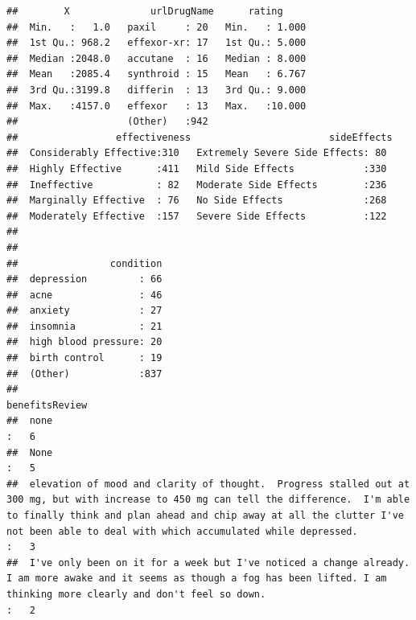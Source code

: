 \documentclass[spanish,]{article}
\begin{document}
\begin{verbatim}
##        X              urlDrugName      rating      
##  Min.   :   1.0   paxil     : 20   Min.   : 1.000  
##  1st Qu.: 968.2   effexor-xr: 17   1st Qu.: 5.000  
##  Median :2048.0   accutane  : 16   Median : 8.000  
##  Mean   :2085.4   synthroid : 15   Mean   : 6.767  
##  3rd Qu.:3199.8   differin  : 13   3rd Qu.: 9.000  
##  Max.   :4157.0   effexor   : 13   Max.   :10.000  
##                   (Other)   :942                   
##                 effectiveness                        sideEffects 
##  Considerably Effective:310   Extremely Severe Side Effects: 80  
##  Highly Effective      :411   Mild Side Effects            :330  
##  Ineffective           : 82   Moderate Side Effects        :236  
##  Marginally Effective  : 76   No Side Effects              :268  
##  Moderately Effective  :157   Severe Side Effects          :122  
##                                                                  
##                                                                  
##                condition  
##  depression         : 66  
##  acne               : 46  
##  anxiety            : 27  
##  insomnia           : 21  
##  high blood pressure: 20  
##  birth control      : 19  
##  (Other)            :837  
##                                                                                                                                                                                                                                                                                                                benefitsReview
##  none                                                                                                                                                                                                                                                                                                                 :   6  
##  None                                                                                                                                                                                                                                                                                                                 :   5  
##  elevation of mood and clarity of thought.  Progress stalled out at 300 mg, but with increase to 450 mg can tell the difference.  I'm able to finally think and plan ahead and chip away at all the clutter I've not been able to deal with which accumulated while depressed.                                        :   3  
##  I've only been on it for a week but I've noticed a change already. I am more awake and it seems as though a fog has been lifted. I am thinking more clearly and don't feel so down.                                                                                                                                  :   2  

\end{verbatim}
\end{document}
